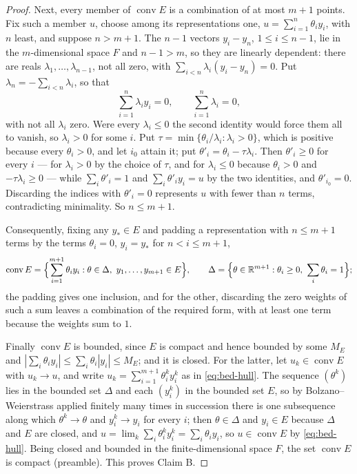 \begin{proof}
Next, every member of $\operatorname{conv}E$ is a combination of at most $m+1$
points. Fix such a member $u$, choose among its representations one,
$u=\sum_{i=1}^n\theta_iy_i$, with $n$ least, and suppose $n>m+1$. The $n-1$
vectors $y_i-y_n$, $1\le i\le n-1$, lie in the $m$-dimensional space $F$ and
$n-1>m$, so they are linearly dependent: there are reals
$\lambda_1,\dots,\lambda_{n-1}$, not all zero, with
$\sum_{i<n}\lambda_i(y_i-y_n)=0$. Put $\lambda_n=-\sum_{i<n}\lambda_i$, so that
\[
  \sum_{i=1}^n\lambda_iy_i=0,\qquad\sum_{i=1}^n\lambda_i=0,
\]
with not all $\lambda_i$ zero. Were every $\lambda_i\le0$ the second identity
would force them all to vanish, so $\lambda_i>0$ for some $i$. Put
$\tau=\min\{\theta_i/\lambda_i:\lambda_i>0\}$, which is positive because every
$\theta_i>0$, and let $i_0$ attain it; put $\theta'_i=\theta_i-\tau\lambda_i$.
Then $\theta'_i\ge0$ for every $i$ — for $\lambda_i>0$ by the choice of $\tau$,
and for $\lambda_i\le0$ because $\theta_i>0$ and $-\tau\lambda_i\ge0$ — while
$\sum_i\theta'_i=1$ and $\sum_i\theta'_iy_i=u$ by the two identities, and
$\theta'_{i_0}=0$. Discarding the indices with $\theta'_i=0$ represents $u$ with
fewer than $n$ terms, contradicting minimality. So $n\le m+1$.

Consequently, fixing any $y_\ast\in E$ and padding a representation with
$n\le m+1$ terms by the terms $\theta_i=0$, $y_i=y_\ast$ for $n<i\le m+1$,
\begin{equation}\label{eq:bed-hull}
  \operatorname{conv}E=\Bigl\{\sum_{i=1}^{m+1}\theta_iy_i:
     \theta\in\Delta,\ y_1,\dots,y_{m+1}\in E\Bigr\},
  \qquad
  \Delta=\Bigl\{\theta\in\mathbb{R}^{m+1}:\theta_i\ge0,\ \sum_i\theta_i=1\Bigr\} ;
\end{equation}
the padding gives one inclusion, and for the other, discarding the zero weights
of such a sum leaves a combination of the required form, with at least one term
because the weights sum to $1$.

Finally $\operatorname{conv}E$ is bounded, since $E$ is compact and hence
bounded by some $M_E$ and $|\sum_i\theta_iy_i|\le\sum_i\theta_i|y_i|\le M_E$;
and it is closed. For the latter, let $u_k\in\operatorname{conv}E$ with
$u_k\to u$, and write $u_k=\sum_{i=1}^{m+1}\theta^k_iy^k_i$ as in
\eqref{eq:bed-hull}. The sequence $(\theta^k)$ lies in the bounded set $\Delta$
and each $(y^k_i)$ in the bounded set $E$, so by Bolzano--Weierstrass applied
finitely many times in succession there is one subsequence along which
$\theta^k\to\theta$ and $y^k_i\to y_i$ for every $i$; then $\theta\in\Delta$ and
$y_i\in E$ because $\Delta$ and $E$ are closed, and
$u=\lim_k\sum_i\theta^k_iy^k_i=\sum_i\theta_iy_i$, so
$u\in\operatorname{conv}E$ by \eqref{eq:bed-hull}. Being closed and bounded in
the finite-dimensional space $F$, the set $\operatorname{conv}E$ is compact
(preamble). This proves Claim B.


\end{proof}
